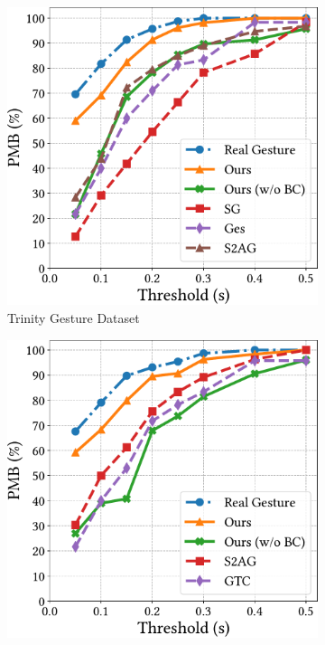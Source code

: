 \begin{table}[t]
\end{table}

\begin{figure}[t]
    \centering
    \begin{subfigure}[t]{0.47\linewidth}
        \centering
        \includegraphics[width=\linewidth]{figures/table1a.pdf}
        \caption{Trinity Gesture Dataset}
        \label{fig:table1a}
    \end{subfigure}
    \hspace{\fill}
    \begin{subfigure}[t]{0.47\linewidth}
        \centering
        \includegraphics[width=\linewidth]{figures/table1b.pdf}

\end{subfigure}
\end{figure}
